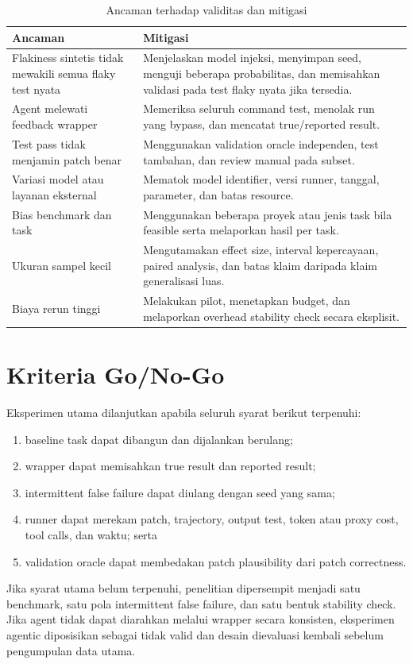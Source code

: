 \begin{table}[htbp]
\centering
\small
\renewcommand{\arraystretch}{1.25}
\caption{Ancaman terhadap validitas dan mitigasi}
\label{tab:validity}
\begin{tabularx}{\textwidth}{p{4.0cm}Y}
\toprule
\textbf{Ancaman} & \textbf{Mitigasi} \\
\midrule
Flakiness sintetis tidak mewakili semua flaky test nyata & Menjelaskan model injeksi, menyimpan seed, menguji beberapa probabilitas, dan memisahkan validasi pada test flaky nyata jika tersedia. \\
Agent melewati feedback wrapper & Memeriksa seluruh command test, menolak run yang bypass, dan mencatat true/reported result. \\
Test pass tidak menjamin patch benar & Menggunakan validation oracle independen, test tambahan, dan review manual pada subset. \\
Variasi model atau layanan eksternal & Mematok model identifier, versi runner, tanggal, parameter, dan batas resource. \\
Bias benchmark dan task & Menggunakan beberapa proyek atau jenis task bila feasible serta melaporkan hasil per task. \\
Ukuran sampel kecil & Mengutamakan effect size, interval kepercayaan, paired analysis, dan batas klaim daripada klaim generalisasi luas. \\
Biaya rerun tinggi & Melakukan pilot, menetapkan budget, dan melaporkan overhead stability check secara eksplisit. \\
\bottomrule
\end{tabularx}
\end{table}

\section{Kriteria Go/No-Go}

Eksperimen utama dilanjutkan apabila seluruh syarat berikut terpenuhi:

\begin{enumerate}[leftmargin=*]
    \item baseline task dapat dibangun dan dijalankan berulang;
    \item wrapper dapat memisahkan true result dan reported result;
    \item intermittent false failure dapat diulang dengan seed yang sama;
    \item runner dapat merekam patch, trajectory, output test, token atau proxy cost, tool calls, dan waktu; serta
    \item validation oracle dapat membedakan patch plausibility dari patch correctness.
\end{enumerate}

Jika syarat utama belum terpenuhi, penelitian dipersempit menjadi satu benchmark, satu pola intermittent false failure, dan satu bentuk stability check. Jika agent tidak dapat diarahkan melalui wrapper secara konsisten, eksperimen agentic diposisikan sebagai tidak valid dan desain dievaluasi kembali sebelum pengumpulan data utama.

